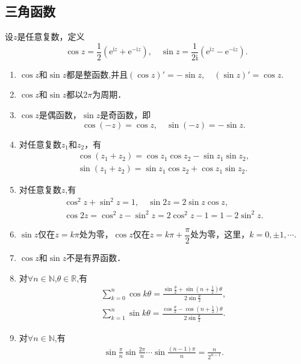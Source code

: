 \documentclass[../../main.tex]{subfiles}%
\begin{document}
\subsection{三角函数}

\begin{definition}
设$z$是任意复数，定义
\[
\cos z = \dfrac{1}{2}(\text{e}^{\text{i}z} + \text{e}^{-\text{i}z}),
\quad
\sin z = \dfrac{1}{2\text{i}}(\text{e}^{\text{i}z} - \text{e}^{-\text{i}z}).
\]
\end{definition}

\begin{theorem}[三角函数的性质]\label{theorem:三角函数的性质}
\begin{enumerate}[(1)]
\item $\cos z$和$\sin z$都是整函数,并且$(\cos z)' = -\sin z,
\quad
(\sin z)' = \cos z.$

\item $\cos z$和$\sin z$都以$2\pi$为周期．

\item $\cos z$是偶函数，$\sin z$是奇函数，即
\[
\cos(-z) = \cos z,
\quad
\sin(-z) = -\sin z.
\]

\item 对任意复数$z_1$和$z_2$，有
\begin{align}
\cos(z_1 + z_2) = \cos z_1 \cos z_2 - \sin z_1 \sin z_2, \label{equation----2.2.2.2.1}
\\
\sin(z_1 + z_2) = \sin z_1 \cos z_2 + \cos z_1 \sin z_2.
\label{equation----2.2.2.2.2} 
\end{align}

\item 对任意复数$z$,有
\begin{gather*}
\cos^2 z + \sin^2 z = 1,
\quad
\sin 2z = 2\sin z \cos z,
\\
\cos 2z=\cos ^2z-\sin ^2z=2\cos ^2z-1=1-2\sin ^2z.
\end{gather*}

\item $\sin z$仅在$z = k\pi$处为零，$\cos z$仅在$z = k\pi + \dfrac{\pi}{2}$处为零，这里，$k = 0, \pm 1, \cdots$.

\item\label{theorem:三角函数的性质-vi} $\cos z$和$\sin z$不是有界函数．

\item 对$\forall n\in \mathbb{N}$,$\theta \in \mathbb{R}$,有
\begin{gather*}
\sum\limits_{k=0}^{n} \cos k\theta = \frac{\sin \frac{\theta}{2} + \sin\left(n + \frac{1}{2}\right)\theta}{2\sin \frac{\theta}{2}},
\\
\sum\limits_{k=1}^{n} \sin k\theta = \frac{\cos \frac{\theta}{2} - \cos\left(n + \frac{1}{2}\right)\theta}{2\sin \frac{\theta}{2}}.
\end{gather*}

\item 对$\forall n\in \mathbb{N}$,有
\begin{align*}
\sin\frac{\pi}{n}\sin\frac{2\pi}{n}\cdots\sin\frac{(n-1)\pi}{n}=\frac{n}{2^{n-1}}.
\end{align*}
\end{enumerate}
\end{theorem}
\end{document}
